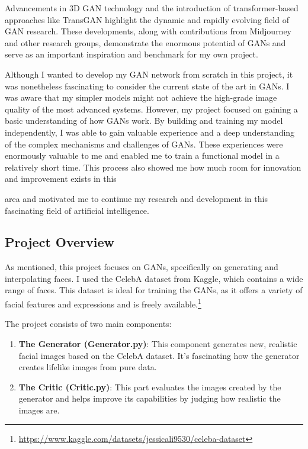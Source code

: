 \documentclass[a4paper, 12pt]{article}
\begin{document}
Advancements in 3D GAN technology and the introduction of transformer-based approaches like TransGAN highlight the dynamic and rapidly evolving field of GAN research.\cite{jiang2021transgan} These developments, along with contributions from Midjourney and other research groups, demonstrate the enormous potential of GANs and serve as an important inspiration and benchmark for my own project.

Although I wanted to develop my GAN network from scratch in this project, it was nonetheless fascinating to consider the current state of the art in GANs. I was aware that my simpler models might not achieve the high-grade image quality of the most advanced systems. However, my project focused on gaining a basic understanding of how GANs work. By building and training my model independently, I was able to gain valuable experience and a deep understanding of the complex mechanisms and challenges of GANs. These experiences were enormously valuable to me and enabled me to train a functional model in a relatively short time. This process also showed me how much room for innovation and improvement exists in this

 area and motivated me to continue my research and development in this fascinating field of artificial intelligence.

\subsection{Project Overview}
As mentioned, this project focuses on GANs, specifically on generating and interpolating faces. I used the CelebA dataset from Kaggle, which contains a wide range of faces. This dataset is ideal for training the GANs, as it offers a variety of facial features and expressions and is freely available.\footnote{\url{https://www.kaggle.com/datasets/jessicali9530/celeba-dataset}}

The project consists of two main components:
\begin{enumerate}
  \item \textbf{The Generator (Generator.py)}: This component generates new, realistic facial images based on the CelebA dataset. It's fascinating how the generator creates lifelike images from pure data.
  \item \textbf{The Critic (Critic.py)}: This part evaluates the images created by the generator and helps improve its capabilities by judging how realistic the images are.
\end{enumerate}
\end{document}
